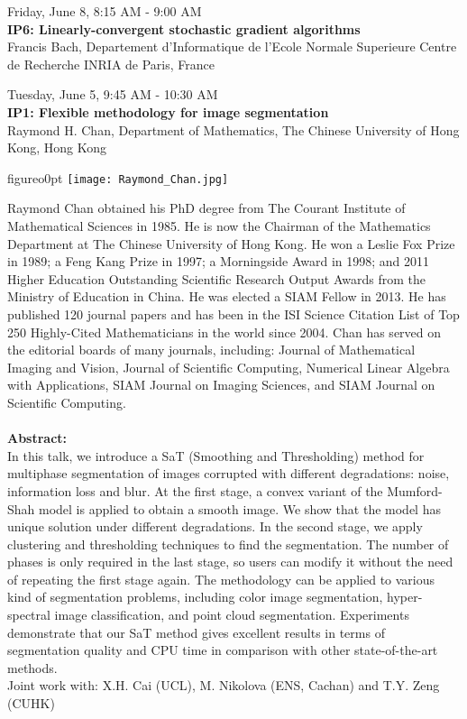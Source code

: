 \begin{center}{\large{
Friday, June 8, 8:15 AM - 9:00 AM \\
\textbf{IP6: Linearly-convergent stochastic gradient algorithms}\\
Francis Bach, Departement d'Informatique de l'Ecole Normale Superieure Centre de Recherche INRIA de Paris, France}}
\end{center}

\newpage\vspace{2cm}
\begin{center}{\Large{
Tuesday, June 5, 9:45 AM - 10:30 AM \\
\textbf{IP1: Flexible methodology for image segmentation}\\
Raymond H. Chan, Department of Mathematics, The Chinese University of Hong Kong, Hong Kong}}
\end{center}
\vspace{1cm}

\begin{wrapfloat}{figure}{o}{0pt}
\texttt{[image: Raymond\_Chan.jpg]}
\end{wrapfloat}

Raymond Chan obtained his PhD degree from The Courant Institute of Mathematical Sciences in 1985. He is now the Chairman of the Mathematics Department at The Chinese University of Hong Kong. He won a Leslie Fox Prize in 1989; a Feng Kang Prize in 1997; a Morningside Award in 1998; and 2011 Higher Education Outstanding Scientific Research Output Awards from the Ministry of Education in China. He was elected a SIAM Fellow in 2013. He has published 120 journal papers and has been in the ISI Science Citation List of Top 250 Highly-Cited Mathematicians in the world since 2004. Chan has served on the editorial boards of many journals, including: Journal of Mathematical Imaging and Vision, Journal of Scientific Computing, Numerical Linear Algebra with Applications, SIAM Journal on Imaging Sciences, and SIAM Journal on Scientific Computing. \\\\
\textbf{Abstract:}\\
In this talk, we introduce a SaT (Smoothing and Thresholding) method for multiphase segmentation of images corrupted with different degradations: noise, information loss and blur. At the first stage, a convex variant of the Mumford-Shah model is applied to obtain a smooth image. We show that the model has unique solution under different degradations. In the second stage, we apply clustering and thresholding techniques to find the segmentation. The number of phases is only required in the last stage, so users can modify it without the need of repeating the first stage again. The methodology can be applied to various kind of segmentation problems, including color image segmentation, hyper-spectral image classification, and point cloud segmentation. Experiments demonstrate that our SaT method gives excellent results in terms of segmentation quality and CPU time in comparison with other state-of-the-art methods. \\Joint work with: X.H. Cai (UCL), M. Nikolova (ENS, Cachan) and T.Y. Zeng (CUHK)


